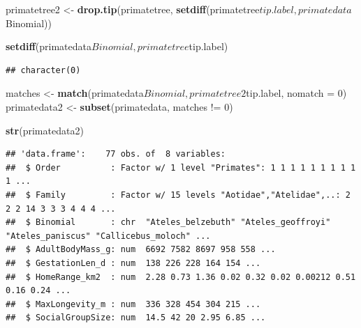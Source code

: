 \documentclass[]{article}
\newenvironment{Shaded}{\begin{snugshade}}{\end{snugshade}}
\newcommand{\KeywordTok}[1]{\textcolor[rgb]{0.13,0.29,0.53}{\textbf{{#1}}}}
\newcommand{\DataTypeTok}[1]{\textcolor[rgb]{0.13,0.29,0.53}{{#1}}}
\newcommand{\DecValTok}[1]{\textcolor[rgb]{0.00,0.00,0.81}{{#1}}}
\newcommand{\StringTok}[1]{\textcolor[rgb]{0.31,0.60,0.02}{{#1}}}
\newcommand{\NormalTok}[1]{{#1}}
\begin{document}
\begin{Shaded}
\begin{Highlighting}[]
\NormalTok{primatetree2 <-}\StringTok{ }\KeywordTok{drop.tip}\NormalTok{(primatetree, }\KeywordTok{setdiff}\NormalTok{(primatetree$tip.label, primatedata$Binomial))}
\end{Highlighting}
\end{Shaded}

\begin{Shaded}
\begin{Highlighting}[]
\KeywordTok{setdiff}\NormalTok{(primatedata$Binomial, primatetree$tip.label)}
\end{Highlighting}
\end{Shaded}

\begin{verbatim}
## character(0)
\end{verbatim}

\begin{Shaded}
\begin{Highlighting}[]
\NormalTok{matches <-}\StringTok{ }\KeywordTok{match}\NormalTok{(primatedata$Binomial, primatetree2$tip.label, }\DataTypeTok{nomatch =} \DecValTok{0}\NormalTok{)}
\NormalTok{primatedata2 <-}\StringTok{ }\KeywordTok{subset}\NormalTok{(primatedata, matches !=}\StringTok{ }\DecValTok{0}\NormalTok{)}
\end{Highlighting}
\end{Shaded}

\begin{Shaded}
\begin{Highlighting}[]
\KeywordTok{str}\NormalTok{(primatedata2)}
\end{Highlighting}
\end{Shaded}

\begin{verbatim}
## 'data.frame':    77 obs. of  8 variables:
##  $ Order          : Factor w/ 1 level "Primates": 1 1 1 1 1 1 1 1 1 1 ...
##  $ Family         : Factor w/ 15 levels "Aotidae","Atelidae",..: 2 2 2 14 3 3 3 4 4 4 ...
##  $ Binomial       : chr  "Ateles_belzebuth" "Ateles_geoffroyi" "Ateles_paniscus" "Callicebus_moloch" ...
##  $ AdultBodyMass_g: num  6692 7582 8697 958 558 ...
##  $ GestationLen_d : num  138 226 228 164 154 ...
##  $ HomeRange_km2  : num  2.28 0.73 1.36 0.02 0.32 0.02 0.00212 0.51 0.16 0.24 ...
##  $ MaxLongevity_m : num  336 328 454 304 215 ...
##  $ SocialGroupSize: num  14.5 42 20 2.95 6.85 ...
\end{verbatim}
\end{document}
